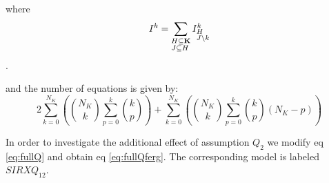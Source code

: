 where $$I^k=\sum_{\begin{subarray}{l}H \subseteq \mathbf{K} \\ J
    \subseteq H \end{subarray}} I^k_{\begin{subarray}{l}H\\ J
    \setminus k \end{subarray}}$$.

and the number of equations is given by: $$2 \sum_{k=0}^{N_K} \left
  (\binom{N_K}{k} \sum_{p=0}^k \binom {k}{p} \right) + \sum_{k=0}^{N_K}
\left( \binom{N_K}{k} \sum_{p=0}^k \binom{k}{p}(N_K-p) \right ) $$

In order to investigate the additional effect of assumption $Q_{2}$ we
modify eq \eqref{eq:fullQ} and obtain eq \eqref{eq:fullQferg}. The
corresponding model is labeled $SIRXQ_{12}$.

